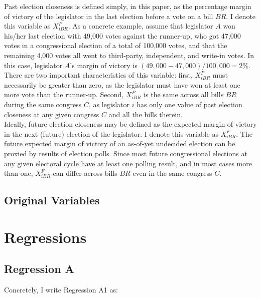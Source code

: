 \documentclass[ProjectKWK]{subfiles}
\begin{document}
Past election closeness is defined simply, in this paper, as the percentage margin of victory of the legislator in the last election before a vote on a bill $BR$. I denote this variable as $X^{P}_{iBR}$. As a concrete example, assume that legislator $A$ won his/her last election with 49,000 votes against the runner-up, who got 47,000 votes in a congressional election of a total of 100,000 votes, and that the remaining 4,000 votes all went to third-party, independent, and write-in votes. In this case, legislator $A$'s margin of victory is $(49,000-47,000)/100,000 = 2\%$. There are two important characteristics of this variable: first, $X^{P}_{iBR}$ must necessarily be greater than zero, as the legislator must have won at least one more vote than the runner-up. Second, $X^{P}_{iBR}$ is the same across all bills $BR$ during the same congress $C$, as legislator $i$ has only one value of past election closeness at any given congress $C$ and all the bills therein. \\

Ideally, future election closeness may be defined as the expected margin of victory in the next (future) election of the legislator. I denote this variable as $X^{F}_{iBR}$. The future expected margin of victory of an as-of-yet undecided election can be proxied by results of election polls. Since most future congressional elections at any given electoral cycle have at least one polling result, and in most cases more than one, $X^{F}_{iBR}$ can differ across bills $BR$ even in the same congress $C$.


\subsection{Original Variables}\label{subsec:OriginalVariables}



\hypertarget{Regressions}{}

\section{Regressions}

\subsection{Regression A}\label{subsec:Regression A}


Concretely, I write Regression A1 as:


\end{document}
